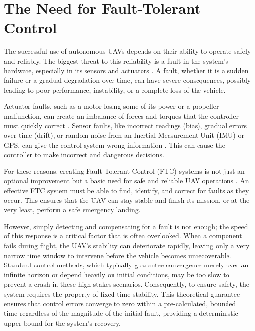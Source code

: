 \section{The Need for Fault-Tolerant Control}
\label{sec:intro_ftc}

The successful use of autonomous UAVs depends on their ability to operate safely and reliably. The biggest threat to this reliability is a fault in the system's hardware, especially in its sensors and actuators \cite{fault}. A fault, whether it is a sudden failure or a gradual degradation over time, can have severe consequences, possibly leading to poor performance, instability, or a complete loss of the vehicle.

Actuator faults, such as a motor losing some of its power or a propeller malfunction, can create an imbalance of forces and torques that the controller must quickly correct \cite{A_fault}. Sensor faults, like incorrect readings (bias), gradual errors over time (drift), or random noise from an Inertial Measurement Unit (IMU) or GPS, can give the control system wrong information \cite{S_fault}. This can cause the controller to make incorrect and dangerous decisions.

For these reasons, creating Fault-Tolerant Control (FTC) systems is not just an optional improvement but a basic need for safe and reliable UAV operations \cite{ftc_UAV_review1,ftc_UAV_review2}. An effective FTC system must be able to find, identify, and correct for faults as they occur. This ensures that the UAV can stay stable and finish its mission, or at the very least, perform a safe emergency landing.

However, simply detecting and compensating for a fault is not enough; the speed of this response is a critical factor that is often overlooked. When a component fails during flight, the UAV’s stability can deteriorate rapidly, leaving only a very narrow time window to intervene before the vehicle becomes unrecoverable. Standard control methods, which typically guarantee convergence merely over an infinite horizon or depend heavily on initial conditions, may be too slow to prevent a crash in these high-stakes scenarios. Consequently, to ensure safety, the system requires the property of fixed-time stability. This theoretical guarantee ensures that control errors converge to zero within a pre-calculated, bounded time regardless of the magnitude of the initial fault, providing a deterministic upper bound for the system's recovery.

